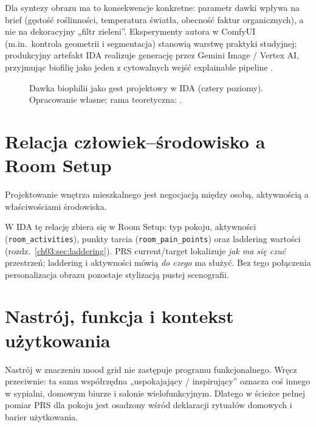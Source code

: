 Dla syntezy obrazu ma to konsekwencje konkretne: parametr dawki wpływa na brief (gęstość roślinności, temperatura światła, obecność faktur organicznych), a nie na dekoracyjny „filtr zieleni”.
Eksperymenty autora w ComfyUI (m.in.\ kontrola geometrii i segmentacja) stanowią warstwę praktyki studyjnej; produkcyjny artefakt IDA realizuje generację przez Gemini Image / Vertex AI, przyjmując biofilię jako jeden z cytowalnych wejść explainable pipeline \parencite{idaPlatform2026}.

\begin{figure}[htbp]
  \centering
  \caption{Dawka biophilii jako gest projektowy w IDA (cztery poziomy).
    Opracowanie własne; rama teoretyczna: \textcite{kellert2008biophilic}.}
  \label{fig:ch02:biophilia}
\end{figure}

\section{Relacja człowiek--środowisko a Room Setup}
\label{ch02:sec:peo}

Projektowanie wnętrza mieszkalnego jest negocjacją między osobą, aktywnością a właściwościami środowiska.

W IDA tę relację zbiera się w Room Setup: typ pokoju, aktywności (\texttt{room\_activities}), punkty tarcia (\texttt{room\_pain\_points}) oraz laddering wartości (rozdz.~\ref{ch03:sec:laddering}).
PRS current/target lokalizuje \emph{jak ma się czuć} przestrzeń; laddering i aktywności mówią \emph{do czego} ma służyć.
Bez tego połączenia personalizacja obrazu pozostaje stylizacją pustej scenografii.

\section{Nastrój, funkcja i kontekst użytkowania}
\label{ch02:sec:nastroj}

Nastrój w znaczeniu mood grid nie zastępuje programu funkcjonalnego.
Wręcz przeciwnie: ta sama współrzędna „uspokajający / inspirujący” oznacza coś innego w sypialni, domowym biurze i salonie wielofunkcyjnym.
Dlatego w ścieżce pełnej pomiar PRS dla pokoju jest osadzony wśród deklaracji rytuałów domowych i barier użytkowania.

